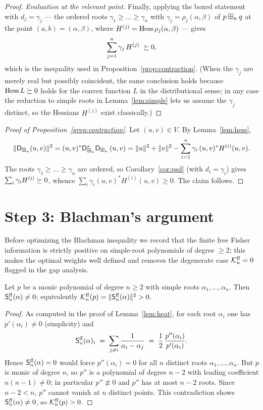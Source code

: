 \begin{proof}
\smallskip\noindent\textit{Evaluation at the relevant point.}
Finally, applying the boxed statement with $d_j=\gamma_j$ — the ordered roots
$\gamma_1\ge\dots\ge\gamma_n$ with $\gamma_j=\rho_j(\alpha,\beta)$ of $p\boxplus_n q$ at the point
$(a,b)=(\alpha,\beta)$, where $H^{(j)}=\operatorname{Hess}\rho_j(\alpha,\beta)$ — gives
\[
\sum_{j=1}^n \gamma_j\,H^{(j)}\;\succeq 0,
\]
which is the inequality used in Proposition~\ref{prop:contraction}. (When the
$\gamma_j$ are merely real but possibly coincident, the same conclusion holds
because $\operatorname{Hess} L\succeq 0$ holds for the convex function $L$ in the
distributional sense; in any case the reduction to simple roots in
Lemma~\ref{lem:simple} lets us assume the $\gamma_j$ distinct, so the Hessians
$H^{(j)}$ exist classically.)
\end{proof}

\begin{proof}[Proof of Proposition~\ref{prop:contraction}]
Let $(u,v)\in V$. By Lemma~\ref{lem:hess},
\[
\|\mathsf{D}_{\boxplus_n}(u,v)\|^2=(u,v)^\ast \mathsf{D}_{\boxplus_n}^\ast\mathsf{D}_{\boxplus_n}\,(u,v)
=\|u\|^2+\|v\|^2-\sum_{i=1}^n\gamma_i\,(u,v)^\ast H^{(i)}(u,v).
\]
The roots $\gamma_1\ge\dots\ge\gamma_n$ are ordered, so
Corollary~\ref{cor:psd} (with $d_i=\gamma_i$) gives $\sum_i\gamma_i H^{(i)}\succeq 0$,
whence $\sum_i\gamma_i(u,v)^\ast H^{(i)}(u,v)\ge0$. The claim follows.
\end{proof}

\section*{Step 3: Blachman's argument}

Before optimizing the Blachman inequality we record that the finite free Fisher
information is strictly positive on simple-root polynomials of degree $\ge2$; this
makes the optimal weights well defined and removes the degenerate case
$\mathcal{K}^{\mathrm{ff}}_n=0$ flagged in the gap analysis.

\begin{qfourlemma}\label{lem:positive}
Let $p$ be a monic polynomial of degree $n\ge2$ with simple roots
$\alpha_1,\dots,\alpha_n$. Then $\mathsf{S}^{\mathrm{ff}}_n(\alpha)\ne0$; equivalently
$\mathcal{K}^{\mathrm{ff}}_n(p)=\|\mathsf{S}^{\mathrm{ff}}_n(\alpha)\|^2>0$.
\end{qfourlemma}

\begin{proof}
As computed in the proof of Lemma~\ref{lem:heat}, for each root $\alpha_i$ one has
$p'(\alpha_i)\ne0$ (simplicity) and
\[
\mathsf{S}^{\mathrm{ff}}_n(\alpha)_i\;=\;\sum_{j\ne i}\frac{1}{\alpha_i-\alpha_j}
\;=\;\frac{1}{2}\,\frac{p''(\alpha_i)}{p'(\alpha_i)} .
\]
Hence $\mathsf{S}^{\mathrm{ff}}_n(\alpha)=0$ would force $p''(\alpha_i)=0$ for all $n$ distinct
roots $\alpha_1,\dots,\alpha_n$. But $p$ is monic of degree $n$, so $p''$ is a
polynomial of degree $n-2$ with leading coefficient $n(n-1)\ne0$; in particular
$p''\not\equiv0$ and $p''$ has at most $n-2$ roots. Since $n-2<n$, $p''$ cannot
vanish at $n$ distinct points. This contradiction shows $\mathsf{S}^{\mathrm{ff}}_n(\alpha)\ne0$,
so $\mathcal{K}^{\mathrm{ff}}_n(p)>0$.
\end{proof}

